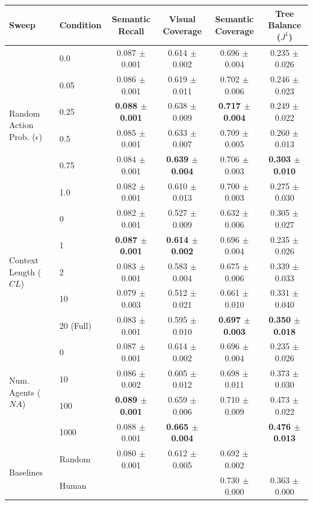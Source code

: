 \begin{tabular}{llcccc}
\toprule
Sweep & Condition & Semantic Recall & Visual Coverage & Semantic Coverage & Tree Balance ($J^1$) \\
\midrule
\multirow{6}{*}{Random Action Prob. ($\epsilon$)} & \cellcolor[gray]{0.9}0.0 & \cellcolor[gray]{0.9}0.087 $\pm$ 0.001 & \cellcolor[gray]{0.9}0.614 $\pm$ 0.002 & \cellcolor[gray]{0.9}0.696 $\pm$ 0.004 & \cellcolor[gray]{0.9}0.235 $\pm$ 0.026 \\
 & 0.05 & 0.086 $\pm$ 0.001 & 0.619 $\pm$ 0.011 & 0.702 $\pm$ 0.006 & 0.246 $\pm$ 0.023 \\
 & 0.25 & \textbf{0.088 $\pm$ 0.001} & 0.638 $\pm$ 0.009 & \textbf{0.717 $\pm$ 0.004} & 0.249 $\pm$ 0.022 \\
 & 0.5 & 0.085 $\pm$ 0.001 & 0.633 $\pm$ 0.007 & 0.709 $\pm$ 0.005 & 0.260 $\pm$ 0.013 \\
 & 0.75 & 0.084 $\pm$ 0.001 & \textbf{0.639 $\pm$ 0.004} & 0.706 $\pm$ 0.003 & \textbf{0.303 $\pm$ 0.010} \\
 & 1.0 & 0.082 $\pm$ 0.001 & 0.610 $\pm$ 0.013 & 0.700 $\pm$ 0.003 & 0.275 $\pm$ 0.030 \\
\midrule
\multirow{5}{*}{Context Length ($CL$)} & 0 & 0.082 $\pm$ 0.001 & 0.527 $\pm$ 0.009 & 0.632 $\pm$ 0.006 & 0.305 $\pm$ 0.027 \\
 & \cellcolor[gray]{0.9}1 & \cellcolor[gray]{0.9}\textbf{0.087 $\pm$ 0.001} & \cellcolor[gray]{0.9}\textbf{0.614 $\pm$ 0.002} & \cellcolor[gray]{0.9}0.696 $\pm$ 0.004 & \cellcolor[gray]{0.9}0.235 $\pm$ 0.026 \\
 & 2 & 0.083 $\pm$ 0.001 & 0.583 $\pm$ 0.004 & 0.675 $\pm$ 0.006 & 0.339 $\pm$ 0.033 \\
 & 10 & 0.079 $\pm$ 0.003 & 0.512 $\pm$ 0.021 & 0.661 $\pm$ 0.010 & 0.331 $\pm$ 0.040 \\
 & 20 (Full) & 0.083 $\pm$ 0.001 & 0.595 $\pm$ 0.010 & \textbf{0.697 $\pm$ 0.003} & \textbf{0.350 $\pm$ 0.018} \\
\midrule
\multirow{4}{*}{Num. Agents ($NA$)} & \cellcolor[gray]{0.9}0 & \cellcolor[gray]{0.9}0.087 $\pm$ 0.001 & \cellcolor[gray]{0.9}0.614 $\pm$ 0.002 & \cellcolor[gray]{0.9}0.696 $\pm$ 0.004 & \cellcolor[gray]{0.9}0.235 $\pm$ 0.026 \\
 & 10 & 0.086 $\pm$ 0.002 & 0.605 $\pm$ 0.012 & 0.698 $\pm$ 0.011 & 0.373 $\pm$ 0.030 \\
 & 100 & \textbf{0.089 $\pm$ 0.001} & 0.659 $\pm$ 0.006 & 0.710 $\pm$ 0.009 & 0.473 $\pm$ 0.022 \\
 & 1000 & 0.088 $\pm$ 0.001 & \textbf{0.665 $\pm$ 0.004} & \cellcolor[rgb]{0.75, 1, 0.75}{\textbf{0.734 $\pm$ 0.013}} & \textbf{0.476 $\pm$ 0.013} \\
\midrule
\multirow{2}{*}{Baselines} & Random & 0.080 $\pm$ 0.001 & 0.612 $\pm$ 0.005 & 0.692 $\pm$ 0.002 & \cellcolor[rgb]{0.75, 1, 0.75}{0.540 $\pm$ 0.003} \\
 & Human & \cellcolor[rgb]{0.75, 1, 0.75}{0.089 $\pm$ 0.000} & \cellcolor[rgb]{0.75, 1, 0.75}{0.681 $\pm$ 0.000} & 0.730 $\pm$ 0.000 & 0.363 $\pm$ 0.000 \\
\bottomrule
\end{tabular}